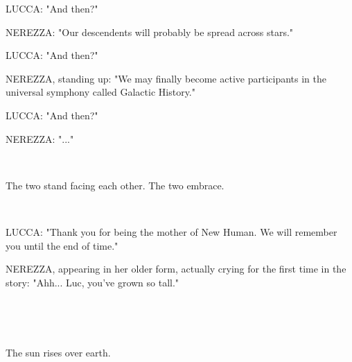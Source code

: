\documentclass[11pt]{article}
\begin{document}
LUCCA: "And then?"

NEREZZA: "Our descendents will probably be spread across stars."

LUCCA: "And then?"

NEREZZA, standing up: "We may finally become active participants in the universal symphony called Galactic History."

LUCCA: "And then?"

NEREZZA: "..."

\ 

The two stand facing each other.
The two embrace. 

\ 

LUCCA: "Thank you for being the mother of New Human.
We will remember you until the end of time."

NEREZZA, appearing in her older form, actually crying for the first time in the story: "Ahh... Luc, you've grown so tall."

\ 

\ 

The sun rises over earth.
\end{document}
